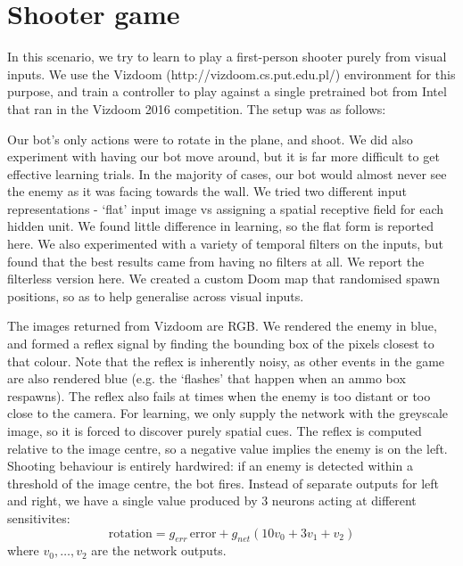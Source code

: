\documentclass{llncs}
\begin{document}
\section{Shooter game}

In this scenario, we try to learn to play a first-person shooter purely from visual inputs. We use the Vizdoom (http://vizdoom.cs.put.edu.pl/) environment for this purpose, and train a controller to play against a single pretrained bot from Intel that ran in the Vizdoom 2016 competition. The setup was as follows:

Our bot’s only actions were to rotate in the plane, and shoot. We did also experiment with having our bot move around, but it is far more difficult to get effective learning trials. In the majority of cases, our bot would almost never see the enemy as it was facing towards the wall. We tried two different input representations - ‘flat’ input image vs assigning a spatial receptive field for each hidden unit. We found little difference in learning, so the flat form is reported here. We also experimented with a variety of temporal filters on the inputs, but found that the best results came from having no filters at all. We report the filterless version here. We created a custom Doom map that randomised spawn positions, so as to help generalise across visual inputs.

The images returned from Vizdoom are RGB. We rendered the enemy in blue, and formed a reflex signal by finding the bounding box of the pixels closest to that colour. Note that the reflex is inherently noisy, as other events in the game are also rendered blue (e.g. the ‘flashes’ that happen when an ammo box respawns). The reflex also fails at times when the enemy is too distant or too close to the camera. For learning, we only supply the network with the greyscale image, so it is forced to discover purely spatial cues. The reflex is computed relative to the image centre, so a negative value implies the enemy is on the left. Shooting behaviour is entirely hardwired: if an enemy is detected within a threshold of the image centre, the bot fires. Instead of separate outputs for left and right, we have a single value produced by 3 neurons acting at different sensitivites:
\begin{equation}
\mathrm{rotation} = g_{err}\, \mathrm{error} + g_{net} \left( 10 v_0 + 3 v_1 + v_2 \right)
\end{equation}
where $v_0, \ldots, v_2$ are the network outputs.
\end{document}
